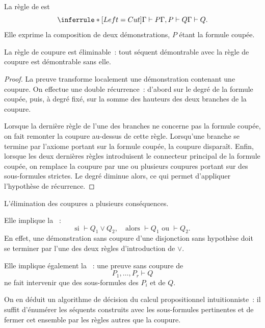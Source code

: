 La règle de  est
\[
\inferrule*[Left={Cut}]
 {\Gamma\vdash P\\
  \Gamma,P\vdash Q}
 {\Gamma\vdash Q}.
\]
Elle exprime la composition de deux démonstrations, $P$ étant la
formule coupée.

\begin{thm}[Gentzen]
La règle de coupure est éliminable : tout séquent démontrable avec la
règle de coupure est démontrable sans elle.
\end{thm}

\begin{proof}
La preuve transforme localement une démonstration contenant une
coupure. On effectue une double récurrence : d'abord sur le degré de la
formule coupée, puis, à degré fixé, sur la somme des hauteurs des deux
branches de la coupure.

Lorsque la dernière règle de l'une des branches ne concerne pas la
formule coupée, on fait remonter la coupure au-dessus de cette règle.
Lorsqu'une branche se termine par l'axiome portant sur la formule
coupée, la coupure disparaît. Enfin, lorsque les deux dernières règles
introduisent le connecteur principal de la formule coupée, on remplace
la coupure par une ou plusieurs coupures portant sur des sous-formules
strictes. Le degré diminue alors, ce qui permet d'appliquer l'hypothèse
de récurrence.

\end{proof}

\thingy L'élimination des coupures a plusieurs conséquences.

Elle implique la  :
\[
\text{si }\vdash Q_1\lor Q_2,\quad
\text{alors }\vdash Q_1\text{ ou }\vdash Q_2.
\]
En effet, une démonstration sans coupure d'une disjonction sans
hypothèse doit se terminer par l'une des deux règles d'introduction de
$\lor$.

Elle implique également la  : une
preuve sans coupure de
\[
P_1,\ldots,P_r\vdash Q
\]
ne fait intervenir que des sous-formules des $P_i$ et de $Q$.

On en déduit un algorithme de décision du calcul propositionnel
intuitionniste : il suffit d'énumérer les séquents construits avec les
sous-formules pertinentes et de fermer cet ensemble par les règles
autres que la coupure.

